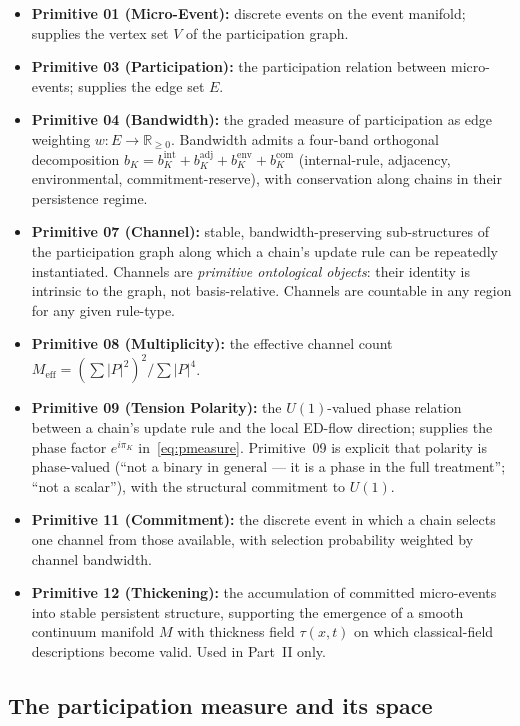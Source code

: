 \documentclass[11pt,a4paper]{article}
\begin{document}
\begin{itemize}
  \item \textbf{Primitive 01 (Micro-Event):} discrete events on the event manifold; supplies the vertex set $V$ of the participation graph.
  \item \textbf{Primitive 03 (Participation):} the participation relation between micro-events; supplies the edge set $E$.
  \item \textbf{Primitive 04 (Bandwidth):} the graded measure of participation as edge weighting $w : E \to \mathbb{R}_{\geq 0}$. Bandwidth admits a four-band orthogonal decomposition $b_K = b_K^\mathrm{int} + b_K^\mathrm{adj} + b_K^\mathrm{env} + b_K^\mathrm{com}$ (internal-rule, adjacency, environmental, commitment-reserve), with conservation along chains in their persistence regime.
  \item \textbf{Primitive 07 (Channel):} stable, bandwidth-preserving sub-structures of the participation graph along which a chain's update rule can be repeatedly instantiated. Channels are \emph{primitive ontological objects}: their identity is intrinsic to the graph, not basis-relative. Channels are countable in any region for any given rule-type.
  \item \textbf{Primitive 08 (Multiplicity):} the effective channel count $M_\mathrm{eff} = (\sum |P|^2)^2 / \sum |P|^4$.
  \item \textbf{Primitive 09 (Tension Polarity):} the $U(1)$-valued phase relation between a chain's update rule and the local ED-flow direction; supplies the phase factor $e^{i \pi_K}$ in~\eqref{eq:pmeasure}. Primitive~09 is explicit that polarity is phase-valued (``not a binary in general --- it is a phase in the full treatment''; ``not a scalar''), with the structural commitment to $U(1)$.
  \item \textbf{Primitive 11 (Commitment):} the discrete event in which a chain selects one channel from those available, with selection probability weighted by channel bandwidth.
  \item \textbf{Primitive 12 (Thickening):} the accumulation of committed micro-events into stable persistent structure, supporting the emergence of a smooth continuum manifold $M$ with thickness field $\tau(x, t)$ on which classical-field descriptions become valid. Used in Part~II only.
\end{itemize}

\subsection{The participation measure and its space}
\end{document}
